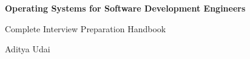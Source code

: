 \begin{titlepage}
    \centering

    \vspace*{2.5cm}

    {\Huge\bfseries Operating Systems for Software Development Engineers\par}

    \vspace{1.2cm}

    {\Large Complete Interview Preparation Handbook\par}

    \vfill

    {\Large Aditya Udai\par}

    \vspace{1cm}

    {\large \the\year\par}

    \vfill

\end{titlepage}

\cleardoublepage